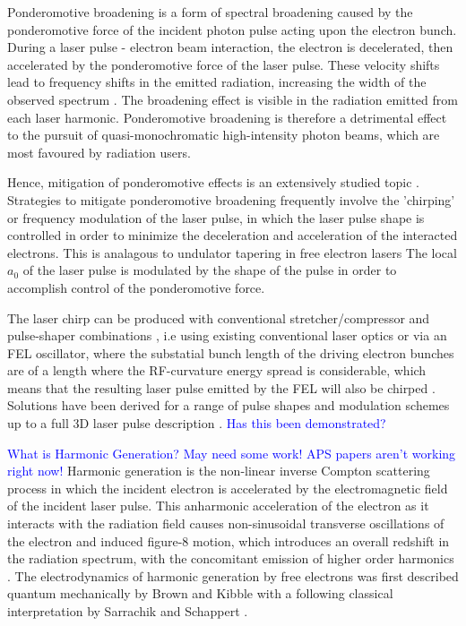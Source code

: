 \documentclass[../main.tex]{subfiles}
\begin{document}
Ponderomotive broadening is a form of spectral broadening caused by the ponderomotive force of the incident photon pulse acting upon the electron bunch. During a laser pulse - electron beam interaction, the electron is decelerated, then accelerated by the ponderomotive force of the laser
pulse. These velocity shifts lead to frequency shifts in the
emitted radiation, increasing the width of the observed
spectrum \cite{krafft2004spectral}. The broadening effect is visible in the radiation emitted from each laser harmonic. Ponderomotive broadening is therefore a detrimental effect to the pursuit of quasi-monochromatic high-intensity photon beams, which are most favoured by radiation users. 

Hence, mitigation of ponderomotive effects is an extensively studied topic \cite{ghebregziabher2013spectral,terzic2014narrow,seipt2015narrowband,rykovanov2016controlling,terzic2016combining,terzic2019improving}. Strategies to mitigate ponderomotive broadening frequently involve the 'chirping' or frequency modulation of the laser pulse, in which the laser pulse shape is controlled in order to minimize the deceleration and acceleration of the interacted electrons. This is analagous to undulator tapering in free electron lasers The local $a_{0}$ of the laser pulse is modulated by the shape of the pulse in order to accomplish control of the ponderomotive force. 

The laser chirp can be produced with conventional stretcher/compressor and pulse-shaper combinations \cite{ghebregziabher2013spectral}, i.e using existing conventional laser optics or via an FEL oscillator, where the substatial bunch length of the driving electron bunches are of a length where the RF-curvature energy spread is considerable, which means that the resulting laser pulse emitted by the FEL will
also be chirped \cite{terzic2014narrow}. Solutions have been derived for a range of pulse shapes and modulation schemes up to a full 3D laser pulse description \cite{terzic2019improving}. \textcolor{blue}{Has this been demonstrated?}


\textcolor{blue}{What is Harmonic Generation? May need some work! APS papers aren't working right now!}
Harmonic generation is the non-linear inverse Compton scattering process in which the incident electron is accelerated by the electromagnetic field of the incident laser pulse. This anharmonic acceleration of the electron as it interacts with the radiation field \cite{englert1983second} causes non-sinusoidal transverse oscillations of the electron and induced figure-8 motion, which introduces an overall redshift in the radiation
spectrum, with the concomitant emission of higher order harmonics \cite{sakai2015observation}. The electrodynamics of harmonic generation by free electrons was first described quantum mechanically by Brown and Kibble \cite{brown1964interaction,kibble1965frequency} with a following classical interpretation by Sarrachik and Schappert \cite{sarachik1970classical}. 
\end{document}
